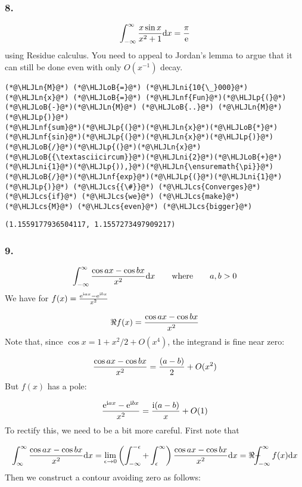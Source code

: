 \documentclass[12pt,a4paper]{article}
\newcommand{\HLJLn}[1]{#1}
\newcommand{\HLJLnf}[1]{\textcolor[RGB]{66,102,213}{#1}}
\newcommand{\HLJLni}[1]{\textcolor[RGB]{59,151,46}{#1}}
\newcommand{\HLJLoB}[1]{\textcolor[RGB]{102,102,102}{\textbf{#1}}}
\newcommand{\HLJLp}[1]{#1}
\newcommand{\HLJLcs}[1]{\textcolor[RGB]{153,153,119}{\textit{#1}}}
\def\D{ {\rm d} }
\def\I{ {\rm i} }
\def\E{ {\rm e} }
\def\qqwhere{\qquad\hbox{where}\qquad}
\def\Xint#1{ \mathchoice
   {\XXint\displaystyle\textstyle{#1} }%
   {\XXint\textstyle\scriptstyle{#1} }%
   {\XXint\scriptstyle\scriptscriptstyle{#1} }%
   {\XXint\scriptscriptstyle\scriptscriptstyle{#1} }%
   \!\int}
\def\XXint#1#2#3{ {\setbox0=\hbox{$#1{#2#3}{\int}$}
     \vcenter{\hbox{$#2#3$}}\kern-.5\wd0} }
\def\dashint{\Xint-}
\def\dx{\D x}
\begin{document}
\subsubsection{8.}
\[
	\int_{-\infty}^\infty    {x \sin x \over x^2 + 1} \dx = { \pi \over \E}
\]
using Residue calculus. You need to appeal to Jordan's lemma to argue that it can still be done even with only $O(x^{-1})$ decay.


\begin{lstlisting}
(*@\HLJLn{M}@*) (*@\HLJLoB{=}@*) (*@\HLJLni{10{\_}000}@*)
(*@\HLJLn{x}@*) (*@\HLJLoB{=}@*) (*@\HLJLnf{Fun}@*)(*@\HLJLp{(}@*)(*@\HLJLoB{-}@*)(*@\HLJLn{M}@*) (*@\HLJLoB{..}@*) (*@\HLJLn{M}@*)(*@\HLJLp{)}@*)
(*@\HLJLnf{sum}@*)(*@\HLJLp{(}@*)(*@\HLJLn{x}@*)(*@\HLJLoB{*}@*)(*@\HLJLnf{sin}@*)(*@\HLJLp{(}@*)(*@\HLJLn{x}@*)(*@\HLJLp{)}@*)(*@\HLJLoB{/}@*)(*@\HLJLp{(}@*)(*@\HLJLn{x}@*)(*@\HLJLoB{{\textasciicircum}}@*)(*@\HLJLni{2}@*)(*@\HLJLoB{+}@*)(*@\HLJLni{1}@*)(*@\HLJLp{)),}@*)(*@\HLJLn{\ensuremath{\pi}}@*)(*@\HLJLoB{/}@*)(*@\HLJLnf{exp}@*)(*@\HLJLp{(}@*)(*@\HLJLni{1}@*)(*@\HLJLp{)}@*) (*@\HLJLcs{{\#}}@*) (*@\HLJLcs{Converges}@*) (*@\HLJLcs{if}@*) (*@\HLJLcs{we}@*) (*@\HLJLcs{make}@*) (*@\HLJLcs{M}@*) (*@\HLJLcs{even}@*) (*@\HLJLcs{bigger}@*)
\end{lstlisting}

\begin{lstlisting}
(1.1559177936504117, 1.1557273497909217)
\end{lstlisting}


\subsubsection{9.}
\[
\int_{-\infty}^\infty {\cos a x - \cos b x \over x^2}  \dx \qqwhere a,b > 0
\]
We have for $f(x) = {\E^{\I a x} - \E^{\I b x} \over x^2}$

\[
\Re f(x) = {\cos a x - \cos b x \over x^2}
\]
Note that, since $\cos x = 1 + x^2/2 + O(x^4)$, the integrand is fine near zero:

\[
{\cos a x - \cos b x \over x^2} = {(a -b)  \over 2} + O(x^2)
\]
But $f(x)$ has a pole:

\[
     {\E^{\I a x} - \E^{\I b x} \over x^2}  = {\I (a-b) \over x} + O(1)
\]
To rectify this, we need to be a bit more careful. First note that

\[
\int_{\infty}^\infty {\cos a x - \cos b x \over x^2} \dx = \lim_{\epsilon \rightarrow 0} \left(\int_{-\infty}^{-\epsilon} + \int_\epsilon^\infty \right){\cos a x - \cos b x \over x^2} \dx = \Re \dashint_{-\infty}^\infty f(x) \dx
\]
Then we construct a contour avoiding zero as follows:
\end{document}
